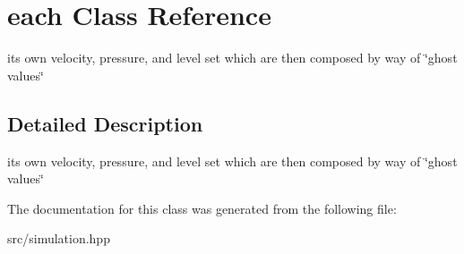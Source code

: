 \hypertarget{classeach}{}\section{each Class Reference}
\label{classeach}


its own velocity, pressure, and level set which are then composed by way of \char`\"{}ghost values\char`\"{}  




\subsection{Detailed Description}
its own velocity, pressure, and level set which are then composed by way of \char`\"{}ghost values\char`\"{} 

The documentation for this class was generated from the following file\+:\begin{DoxyCompactItemize}
\item 
src/simulation.\+hpp\end{DoxyCompactItemize}
